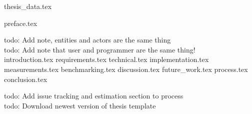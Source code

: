 \documentclass[BSP,english,oneside]{ntnuthesis/ntnubachelorthesis}
\newcommand{\todo}[1]{{\color{cyan}\lbrack todo: #1\rbrack}\\} %
\begin{document}
{thesis_data.tex}

\makefrontpages

{preface.tex}

\tableofcontents
\listoffigures
\listoftables

\todo{Add note, entities and actors are the same thing}
\todo{Add note that user and programmer are the same thing!}

{introduction.tex}
{requirements.tex}
{technical.tex}
{implementation.tex}
{measurements.tex}
{benchmarking.tex}
{discussion.tex}
{future_work.tex}
{process.tex}
{conclusion.tex}




\todo{Add issue tracking and estimation section to process}
\todo{Download newest version of thesis template}
\end{document}
